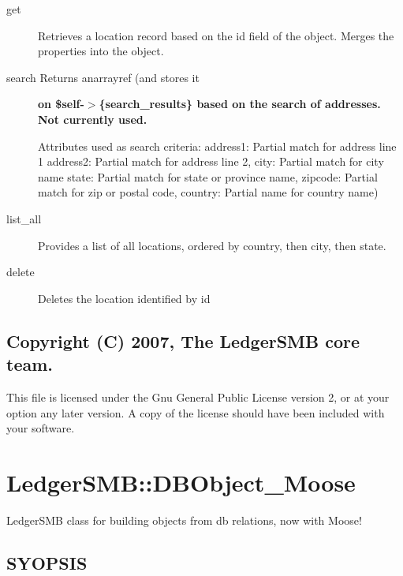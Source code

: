 \begin{description}
\begin{description}
\begin{description}
\begin{description}
\begin{description}
\begin{description}
\begin{description}
\begin{description}
\begin{description}
\begin{description}
\begin{description}
\item[{get}] \mbox{}

Retrieves a location record based on the id field of the object.  Merges the 
properties into the object.


\item[{search Returns anarrayref (and stores it}] \textbf{on \$self-$>$\{search\_results\} based on the search of addresses. Not currently used.}

Attributes used as search criteria:
address1: Partial match for address line 1
address2: Partial match for address line 2,
city:  Partial match for city name
state: Partial match for state or province name, 
zipcode:  Partial match for zip or postal code,
country: Partial name for country name)


\item[{list\_all}] \mbox{}

Provides a list of all locations, ordered by country, then city, then state.


\item[{delete}] \mbox{}

Deletes the location identified by id

\end{description}
\subsection*{Copyright (C) 2007, The LedgerSMB core team.\label{LedgerSMB::Location_Copyright_C_2007_The_LedgerSMB_core_team_}}


This file is licensed under the Gnu General Public License version 2, or at your
option any later version.  A copy of the license should have been included with
your software.

\section{LedgerSMB::DBObject\_Moose\label{LedgerSMB::DBObject_Moose}}


LedgerSMB class for building objects from db 
relations, now with Moose!

\subsection*{SYOPSIS\label{LedgerSMB::DBObject_Moose_SYOPSIS}}



\end{description}
\end{description}
\end{description}
\end{description}
\end{description}
\end{description}
\end{description}
\end{description}
\end{description}
\end{description}
